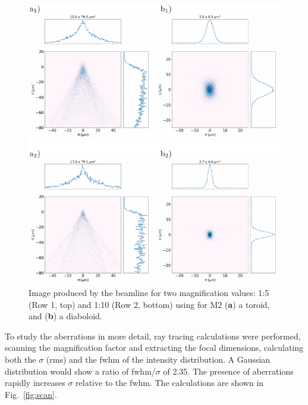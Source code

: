 \documentclass[preprint]{iucr}       %
\newcommand{\inred}[1]{{\color{red}#1}}
\begin{document}
\begin{figure}\label{fig:demagnification}
\includegraphics[width=1.0\textwidth]{figures/fig5.pdf}
% 
% 
\caption{Image produced by the beamline for two magnification values: 1:5 (Row 1, top) and 1:10 (Row 2, bottom) using for M2 (\textbf{a}) a toroid, and (\textbf{b}) a diaboloid.}
\end{figure}

To study the aberrations in more detail, ray tracing calculations were performed, scanning the magnification factor and extracting the focal dimensions, \inred{calculating both the $\sigma$ (rms) and} the fwhm of the intensity distribution. A Gaussian distribution would show a ratio of fwhm/$\sigma$ of 2.35. The presence of aberrations rapidly increases $\sigma$ relative to the fwhm. The calculations are shown in Fig.~\ref{fig:scan}.
\end{document}
